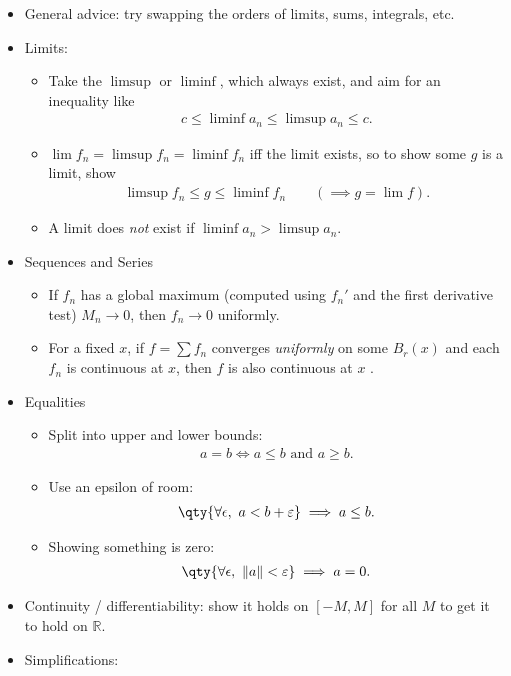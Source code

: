 \begin{itemize}
\item
  General advice: try swapping the orders of limits, sums, integrals,
  etc.
\item
  Limits:

  \begin{itemize}
  \tightlist
  \item
    Take the \(\limsup\) or \(\liminf\), which always exist, and aim for
    an inequality like
    \begin{align*}  
    c \leq \liminf a_n \leq \limsup a_n \leq c
    .\end{align*}
  \item
    \(\lim f_n = \limsup f_n = \liminf f_n\) iff the limit exists, so to
    show some \(g\) is a limit, show
    \begin{align*}  
    \limsup f_n \leq g \leq \liminf f_n \qquad (\implies g = \lim f) 
    .\end{align*}
  \item
    A limit does \emph{not} exist if \(\liminf a_n > \limsup a_n\).
  \end{itemize}
\item
  Sequences and Series

  \begin{itemize}
  \tightlist
  \item
    If \(f_n\) has a global maximum (computed using \(f_n'\) and the
    first derivative test) \(M_n \to 0\), then \(f_n \to 0\) uniformly.
  \item
    For a fixed \(x\), if \(f = \sum f_n\) converges \emph{uniformly} on
    some \(B_r(x)\) and each \(f_n\) is continuous at \(x\), then \(f\)
    is also continuous at \(x\) .
  \end{itemize}
\item
  Equalities

  \begin{itemize}
  \tightlist
  \item
    Split into upper and lower bounds:
    \begin{align*}  
    a=b \iff a\leq b \text{ and }  a\geq b
    .\end{align*}
  \item
    Use an epsilon of room:
    \begin{align*}  
    \qty{ \forall \epsilon, \,\,a < b + \varepsilon} \implies a\leq b 
    .\end{align*}
  \item
    Showing something is zero:
    \begin{align*}  
    \qty{ \forall \epsilon, \,\, {\left\lVert {a} \right\rVert} < \varepsilon} \implies a = 0
    .\end{align*}
  \end{itemize}
\item
  Continuity / differentiability: show it holds on \([-M, M]\) for all
  \(M\) to get it to hold on \({\mathbb{R}}\).
\item
  Simplifications:


\end{itemize}
